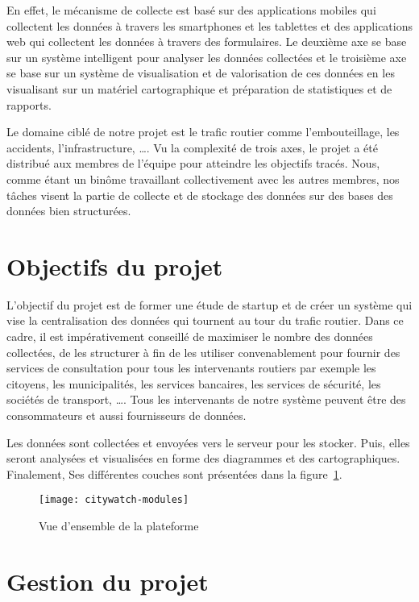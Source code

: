 En effet, le mécanisme de collecte est basé sur des applications mobiles qui
collectent les données à travers les smartphones et les tablettes et des
applications web qui collectent les données à travers des formulaires. Le
deuxième axe se base sur un système intelligent pour analyser les données
collectées et le troisième axe se base sur un système de visualisation et de
valorisation de ces données en les visualisant sur un matériel cartographique
et préparation de statistiques et de rapports.

Le domaine ciblé de notre projet est le trafic routier comme l'embouteillage,
les accidents, l'infrastructure, \ldots.  Vu la complexité de trois axes, le
projet a été distribué aux membres de l'équipe  pour
atteindre les objectifs tracés. Nous, comme étant un binôme travaillant
collectivement avec les autres membres, nos tâches visent la partie de collecte
et de stockage des données sur des bases des données bien structurées.

\section{Objectifs du projet}

L'objectif du projet  est de former une étude de startup
et de créer un système qui vise la centralisation des données qui tournent au
tour du trafic routier. Dans ce cadre, il est impérativement conseillé de
maximiser le nombre des données collectées, de les structurer à fin de les
utiliser convenablement pour fournir des services de consultation pour tous les
intervenants routiers par exemple les citoyens, les municipalités, les services
bancaires, les services de sécurité, les sociétés de transport, \ldots.  Tous les
intervenants de notre système peuvent être des consommateurs et aussi
fournisseurs de données.

Les données sont collectées et envoyées vers le serveur pour les stocker. Puis,
elles seront analysées et visualisées en forme des diagrammes et des
cartographiques.  Finalement, Ses différentes couches sont présentées dans la
figure~\ref{fig:citywatch-modules}.

\begin{figure}[H]
    \centering
    \texttt{[image: citywatch-modules]}
    \caption{Vue d'ensemble de la plateforme }
\label{fig:citywatch-modules}
\end{figure}

\section{Gestion du projet }

